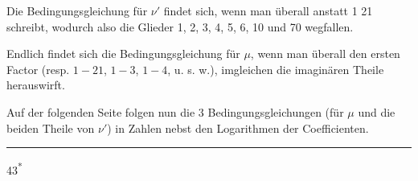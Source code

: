 Die Bedingungsgleichung für \(\nu'\) findet sich, wenn man überall anstatt 1 21 schreibt, wodurch also die Glieder 1, 2, 3, 4, 5, 6, 10 und 70 wegfallen.

Endlich findet sich die Bedingungsgleichung für \(\mu\), wenn man überall den ersten Factor (resp. \(1-21\), \(1-3\), \(1-4\), u. s. w.), imgleichen die imaginären Theile herauswirft.

Auf der folgenden Seite folgen nun die 3 Bedingungsgleichungen (für \(\mu\) und die beiden Theile von \(\nu'\)) in Zahlen nebst den Logarithmen der Coefficienten.
\begin{center}\rule{.18\linewidth}{.4pt}\end{center}
\par\vfill\noindent\hfill43\textsuperscript{*}
